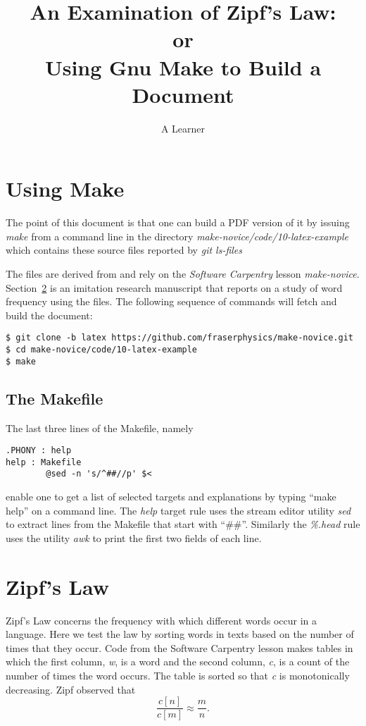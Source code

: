 \documentclass[]{article}
\title{An Examination of Zipf's Law:\\ or\\ Using Gnu Make to Build a
  Document}
\author{A Learner}
\begin{document}
\maketitle

\section{Using Make}
\label{sec:make}

The point of this document is that one can build a PDF version of it
by issuing \emph{make} from a command line in the directory
\emph{make-novice/code/10-latex-example} which contains these
source files reported by \emph{git ls-files}
%

%
The files are derived from and rely on the \emph{Software
  Carpentry}\cite{software-carpentry} lesson \emph{make-novice}.
Section~\ref{sec:zipf} is an imitation research manuscript that
reports on a study of word frequency using the files.  The following
sequence of commands will fetch and build the document:
\begin{verbatim}
$ git clone -b latex https://github.com/fraserphysics/make-novice.git
$ cd make-novice/code/10-latex-example
$ make
\end{verbatim}

\subsection{The Makefile}
\label{sec:makefile}

The last three lines of the Makefile, namely
\begin{verbatim}
.PHONY : help
help : Makefile
        @sed -n 's/^##//p' $<
\end{verbatim}
enable one to get a list of selected targets and explanations by
typing ``make help'' on a command line.  The \emph{help} target rule
uses the stream editor utility \emph{sed} to extract lines from the
Makefile that start with ``\#\#''.  Similarly the \emph{\%.head} rule
uses the utility \emph{awk} to print the first two fields of each
line.

\section{Zipf's Law}
\label{sec:zipf}

Zipf's Law\cite{Zipf} concerns the frequency with which different
words occur in a language.  Here we test the law by sorting words in
texts based on the number of times that they occur.  Code from the
Software Carpentry lesson makes tables in which the first column,
\emph{w}, is a word and the second column, \emph{c}, is a count of the
number of times the word occurs.  The table is sorted so that \emph{c}
is monotonically decreasing.  Zipf observed that
\begin{equation}
  \frac{c[n]}{c[m]} \approx \frac{m}{n}.
\end{equation}
\end{document}
